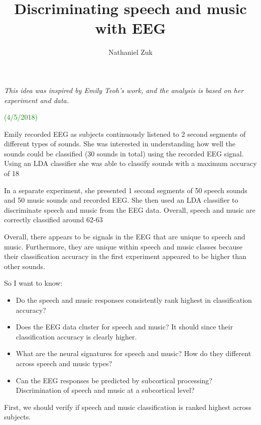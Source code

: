 \documentclass[11pt]{article}
\title{Discriminating speech and music with EEG}
\author{Nathaniel Zuk}
\begin{document}
\maketitle

\textit{This idea was inspired by Emily Teoh's work, and the analysis is based on her experiment and data.}

\textcolor{green}{(4/5/2018)}

Emily recorded EEG as subjects continuously listened to 2 second segments of different types of sounds.  She was interested in understanding how well the sounds could be classified (30 sounds in total) using the recorded EEG signal.  Using an LDA classifier she was able to classify sounds with a maximum accuracy of 18%

In a separate experiment, she presented 1 second segments of 50 speech sounds and 50 music sounds and recorded EEG.  She then used an LDA classifier to discriminate speech and music from the EEG data.  Overall, speech and music are correctly classified around 62-63%

Overall, there appears to be signals in the EEG that are unique to speech and music.  Furthermore, they are unique within speech and music classes because their classification accuracy in the first experiment appeared to be higher than other sounds. 

So I want to know:

\begin{itemize}
\item Do the speech and music responses consistently rank highest in classification accuracy?
\item Does the EEG data cluster for speech and music?  It should since their classification accuracy is clearly higher.
\item What are the neural signatures for speech and music?  How do they different across speech and music types?
\item Can the EEG responses be predicted by subcortical processing?  Discrimination of speech and music at a subcortical level?
\end{itemize}

First, we should verify if speech and music classification is ranked highest across subjects.
\end{document}
